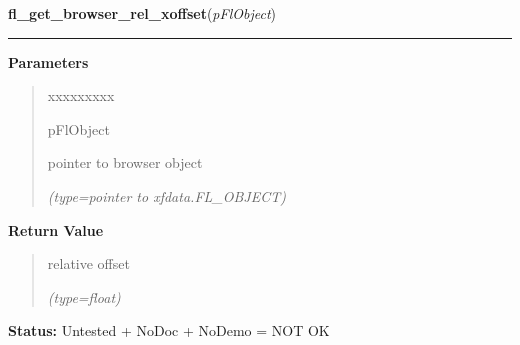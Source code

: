     \label{xformslib:flbrowser:fl_get_browser_rel_xoffset}

    \vspace{0.5ex}

\hspace{.8\funcindent}\begin{boxedminipage}{\funcwidth}

    \raggedright \textbf{fl\_get\_browser\_rel\_xoffset}(\textit{pFlObject})

    \vspace{-1.5ex}

    \rule{\textwidth}{0.5\fboxrule}
\setlength{\parskip}{2ex}
\setlength{\parskip}{1ex}
      \textbf{Parameters}
      \vspace{-1ex}

      \begin{quote}
        \begin{Ventry}{xxxxxxxxx}

          \item[pFlObject]

          pointer to browser object

            {\it (type=pointer to xfdata.FL\_OBJECT)}

        \end{Ventry}

      \end{quote}

      \textbf{Return Value}
    \vspace{-1ex}

      \begin{quote}
      relative offset

      {\it (type=float)}

      \end{quote}

\textbf{Status:} Untested + NoDoc + NoDemo = NOT OK



    \end{boxedminipage}

    \label{xformslib:flbrowser:fl_set_browser_xoffset}

    \vspace{0.5ex}

